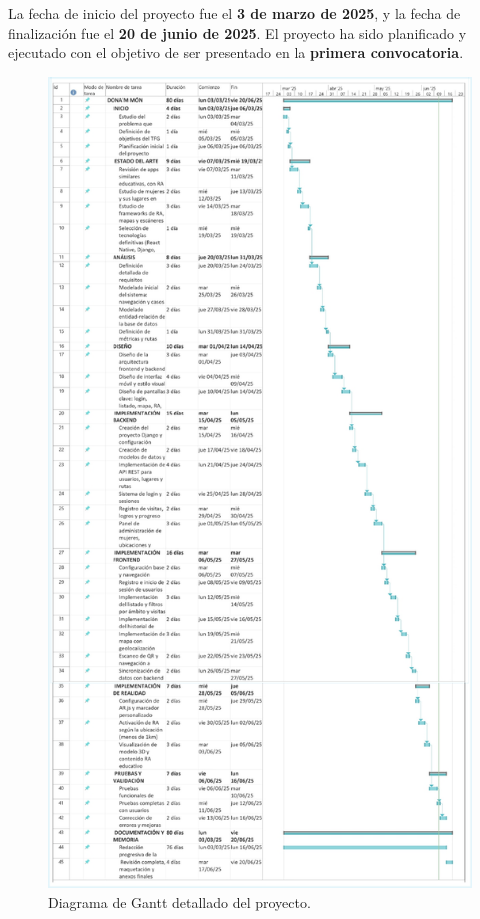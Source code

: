 La fecha de inicio del proyecto fue el \textbf{3 de marzo de 2025}, y la fecha de finalización fue el \textbf{20 de junio de 2025}. El proyecto ha sido planificado y ejecutado con el objetivo de ser presentado en la \textbf{primera convocatoria}.
\clearpage
\begin{figure}[H]
    \centering
    \includegraphics[width=\textwidth,height=0.95\textheight,keepaspectratio]{figs/gantt.jpg}
    \caption{Diagrama de Gantt detallado del proyecto.}
    \label{fig:gantt}
\end{figure} 

